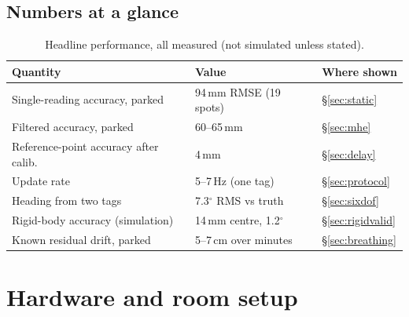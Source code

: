 \documentclass[11pt,a4paper]{article}
\begin{document}
\subsection{Numbers at a glance}

\begin{table}[h]
\centering
\caption{Headline performance, all measured (not simulated unless stated).}
\begin{tabular}{@{}lll@{}}
\toprule
\textbf{Quantity} & \textbf{Value} & \textbf{Where shown}\\
\midrule
Single-reading accuracy, parked        & 94\,mm RMSE (19 spots)      & \S\ref{sec:static}\\
Filtered accuracy, parked              & 60--65\,mm                  & \S\ref{sec:mhe}\\
Reference-point accuracy after calib.  & 4\,mm                       & \S\ref{sec:delay}\\
Update rate                            & 5--7\,Hz (one tag)          & \S\ref{sec:protocol}\\
Heading from two tags                  & 7.3$^\circ$ RMS vs truth    & \S\ref{sec:sixdof}\\
Rigid-body accuracy (simulation)       & 14\,mm centre, 1.2$^\circ$  & \S\ref{sec:rigidvalid}\\
Known residual drift, parked           & 5--7\,cm over minutes       & \S\ref{sec:breathing}\\
\bottomrule
\end{tabular}
\end{table}

\section{Hardware and room setup}
\label{sec:hardware}
\end{document}
